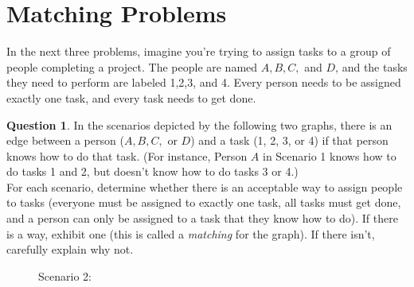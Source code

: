 \documentclass[article, 12pt]{article}
\theoremstyle{definition}
\newtheorem{question}{Question}
\begin{document}
    \section{Matching Problems}
    In the next three problems, imagine you're trying to assign tasks to a group of people completing a project. The people are named $A,B,C,$ and $D$, and the tasks they need to perform are labeled 1,2,3, and 4. Every person needs to be assigned exactly one task, and every task needs to get done.
    \begin{question}
        In the scenarios depicted by the following two graphs, there is an edge between a person ($A, B, C,$ or $D$) and a task (1, 2, 3, or 4) if that person knows how to do that task. (For instance, Person $A$ in Scenario 1 knows how to do tasks 1 and 2, but doesn't know how to do tasks 3 or 4.)
        \\[12pt]
        For each scenario, determine whether there is an acceptable way to assign people to tasks (everyone must be assigned to exactly one task, all tasks must get done, and a person can only be assigned to a task that they know how to do). If there is a way, exhibit one (this is called a \textit{matching} for the graph). If there isn't, carefully explain why not.
        \begin{figure}[H]
            \centering
            \begin{minipage}[b]{0.4\linewidth}
                \caption*{Scenario 1:}
                \centering
            \end{minipage}
            \begin{minipage}[b]{0.4\linewidth}
                \caption*{Scenario 2:}
                \centering
\end{minipage}
\end{figure}
\end{question}
\end{document}
